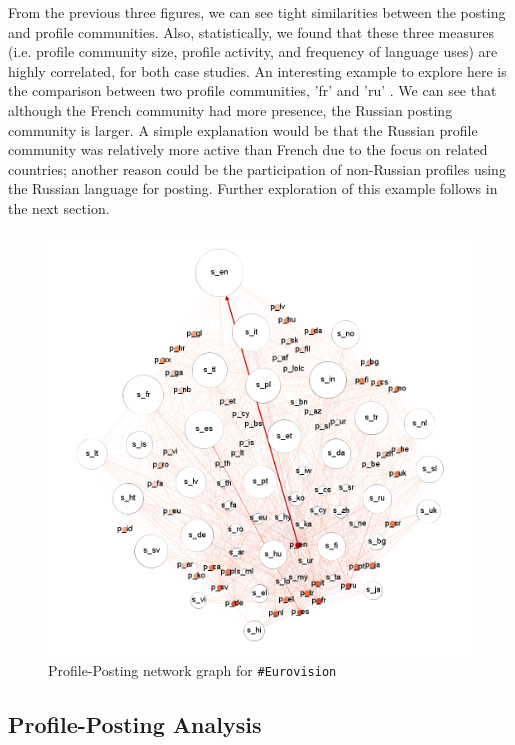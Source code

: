 From the previous three figures, we can see tight similarities between the
posting and profile communities. Also, statistically, we found that these three measures 
(i.e. profile community size, profile activity, and frequency of language uses) are 
highly correlated, for both case studies. An interesting example to explore here is 
the comparison between two profile communities, 'fr' and 'ru' . 
We can see that although the French community had more presence, the 
Russian posting community is larger. A simple explanation would be 
that the Russian profile community was relatively more active than French due to the focus on related
countries; another reason could be the participation of non-Russian
profiles using the Russian language for posting. Further exploration of this example follows
in the next section.

\begin{figure}[htb]
\centering
\includegraphics[width=\columnwidth]{images/euro_pslang.png}
\caption{Profile-Posting network graph for {\texttt{\#Eurovision}}}
\label{fig:eurovisionpslang}
\end{figure}

\subsection{Profile-Posting Analysis}\label{eurovisionppanalysis}


